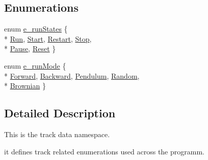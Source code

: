 \subsection*{Enumerations}
\begin{DoxyCompactItemize}
\item 
enum \hyperlink{namespaceTrackEnum_a5f3ef7d4b42d1778e4440dc0aaa149f8}{e\-\_\-run\-States} \{ \\*
\hyperlink{namespaceTrackEnum_a5f3ef7d4b42d1778e4440dc0aaa149f8acb7c3d93bcf2a5186571b9de9248cfd9}{Run}, 
\hyperlink{namespaceTrackEnum_a5f3ef7d4b42d1778e4440dc0aaa149f8ab9bfb032cad6193855f6f9c4b2b69840}{Start}, 
\hyperlink{namespaceTrackEnum_a5f3ef7d4b42d1778e4440dc0aaa149f8a4d9eaa644c727b39d4f2bdfb1729e52a}{Restart}, 
\hyperlink{namespaceTrackEnum_a5f3ef7d4b42d1778e4440dc0aaa149f8a9448ef3d86aa318cbc8c8775ac16d13e}{Stop}, 
\\*
\hyperlink{namespaceTrackEnum_a5f3ef7d4b42d1778e4440dc0aaa149f8a55e7035263749afbedaf9d8a6fc46509}{Pause}, 
\hyperlink{namespaceTrackEnum_a5f3ef7d4b42d1778e4440dc0aaa149f8a7d08d4a02a08563d007b2a60dffa1f1a}{Reset}
 \}
\item 
enum \hyperlink{namespaceTrackEnum_a8d3ecf995f0d913b85c13bd0c03afc56}{e\-\_\-run\-Mode} \{ \\*
\hyperlink{namespaceTrackEnum_a8d3ecf995f0d913b85c13bd0c03afc56a6e838abcbbed75bdda148f45fa376033}{Forward}, 
\hyperlink{namespaceTrackEnum_a8d3ecf995f0d913b85c13bd0c03afc56a94cea214759328a091b5e4ae07a100a7}{Backward}, 
\hyperlink{namespaceTrackEnum_a8d3ecf995f0d913b85c13bd0c03afc56a9e19f63bab4f377d08684f2ee04ee18d}{Pendulum}, 
\hyperlink{namespaceTrackEnum_a8d3ecf995f0d913b85c13bd0c03afc56a665633960b07f69fbe03b827e4ea0d0f}{Random}, 
\\*
\hyperlink{namespaceTrackEnum_a8d3ecf995f0d913b85c13bd0c03afc56a372e9d40caa597b077ce6e9d8a309021}{Brownian}
 \}
\end{DoxyCompactItemize}


\subsection{Detailed Description}
This is the track data namespace.\par
 it defines track related enumerations used across the programm. 

